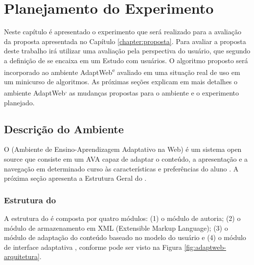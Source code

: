\chapter{Planejamento do Experimento}\label{chapter:experimento}

Neste capítulo é apresentado o experimento que será realizado para a avaliação da proposta apresentada no Capítulo \ref{chapter:proposta}.
Para avaliar a proposta deste trabalho irá utilizar uma avaliação pela perspectiva do usuário, que segundo a definição de
 se encaixa em um Estudo com usuários. O algoritmo proposto será incorporado ao ambiente
AdaptWeb\textsuperscript e avaliado em uma situação real de uso em um minicurso de algoritmos. As próximas seções explicam
em mais detalhes o ambiente AdaptWeb\textsuperscript, as mudanças propostas para o ambiente e o experimento planejado.

\section{Descrição do Ambiente \adaptweb}

O \adaptweb (Ambiente de Ensino-Aprendizagem Adaptativo na Web) é um sistema open source
que consiste em um AVA capaz de adaptar o conteúdo, a apresentação e a navegação em determinado curso às características
e preferências do aluno \cite{gasparini2009adaptweb}. A próxima seção apresenta a Estrutura Geral do
\adaptweb.

\subsection{Estrutura do \adaptweb}

A estrutura do \adaptweb é composta por quatro módulos: (1) o módulo de autoria; (2) o
módulo de armazenamento em XML (Extensible Markup Language); (3) o módulo de adaptação do conteúdo baseado no modelo do
usuário e (4) o módulo de interface adaptativa \cite{gasparini2003interface}, conforme pode ser visto na Figura
\ref{fig:adaptweb-arquitetura}.

